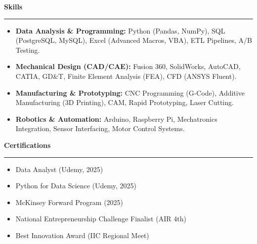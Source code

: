 \documentclass[9pt,letterpaper]{article} %
\newenvironment{rSection}[1]{ %
  \sectionskip
 \textbf{\Large #1} %
  \sectionlineskip
  \hrule %
  \begin{list}{}{ %
    \setlength{\leftmargin}{-0em} %
  }
  \item[]
}{
  \end{list}
}
\def\sectionlineskip{\smallskip} %
\def\sectionskip{} %
\begin{document}
\begin{rSection}{Skills}
\item[] \vspace{-0.5em}
\begin{itemize}[left=-1.5em, labelsep=.1cm, labelwidth=.2cm, itemsep=0.0em]

    \item \textbf{ Data Analysis \& Programming:} Python (Pandas, NumPy), SQL (PostgreSQL, MySQL), Excel (Advanced Macros, VBA), ETL Pipelines, A/B Testing.

    \item \textbf{ Mechanical Design (CAD/CAE):} Fusion 360, SolidWorks, AutoCAD, CATIA, GD\&T, Finite Element Analysis (FEA), CFD (ANSYS Fluent).

    \item \textbf{ Manufacturing \& Prototyping:} CNC Programming (G-Code), Additive Manufacturing (3D Printing), CAM, Rapid Prototyping, Laser Cutting.

    \item \textbf{ Robotics \& Automation:} Arduino, Raspberry Pi, Mechatronics Integration, Sensor Interfacing, Motor Control Systems.

\end{itemize}
\end{rSection}

\begin{rSection}{Certifications}
\item[] \vspace{-1em}
\begin{itemize}[left=-1.5em, labelsep=.1cm, labelwidth=.2cm, itemsep=0.0em]

\item Data Analyst (Udemy, 2025)

\item Python for Data Science (Udemy, 2025)

\item McKinsey Forward Program (2025)

\item National Entrepreneurship Challenge Finalist (AIR 4th)

\item Best Innovation Award (IIC Regional Meet)

\end{itemize}
\end{rSection}
\end{document}
